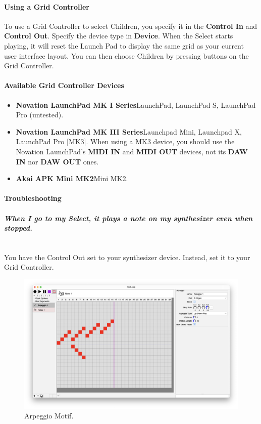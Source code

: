 \documentclass[twoside,10pt]{article}
\begin{document}
\paragraph{Using a Grid Controller}

To use a Grid Controller to select Children, you specify it in the {\bf Control In} and {\bf Control Out}.  Specify the device type in {\bf Device}.  When the Select starts playing, it will reset the Launch Pad to display the same grid as your current user interface layout.  You can then choose Children by pressing buttons on the Grid Controller.

\paragraph{Available Grid Controller Devices}

\begin{itemize}
\item {\bf Novation LaunchPad MK I Series}\qquad LaunchPad, LaunchPad S, LaunchPad Pro (untested).   
\item {\bf Novation LaunchPad MK III Series}\qquad Launchpad Mini, Launchpad X, LaunchPad Pro [MK3].  When using a MK3 device, you should use the Novation LaunchPad's {\bf MIDI IN} and {\bf MIDI OUT} devices, not its {\bf DAW IN} nor {\bf DAW OUT} ones.  
\item {\bf Akai APK Mini MK2}\qquad Mini MK2.   

\end{itemize}

\paragraph{Troubleshooting}

\paragraph{\it When I go to my Select, it plays a note on my synthesizer even when stopped.}~\\
\noindent You have the Control Out set to your synthesizer device.  Instead, set it to your Grid Controller.

\clearpage

\begin{figure}[t]
\centering
\includegraphics[width=6.5in]{Arpeggio}
\vspace{-2em}
\caption{Arpeggio Motif.}
\label{arpeggio}
\end{figure}
\end{document}

